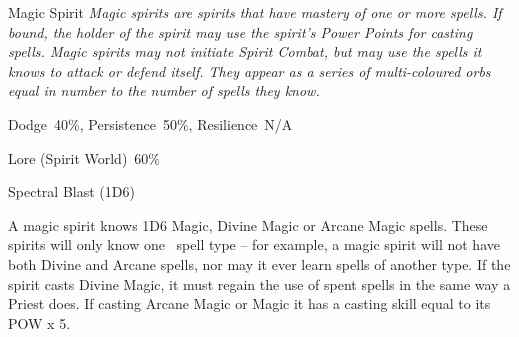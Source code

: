 \begin{samepage}
\begin{monsterbox}{Magic Spirit}
	\textit{Magic spirits are spirits that have mastery of one or more spells. If bound, the holder of the spirit may use the spirit’s Power Points for casting spells. Magic spirits may not initiate Spirit Combat, but may use the spells it knows to attack or defend itself. They appear as a series of multi-coloured orbs equal in number to the number of spells they know.}\\
	\rpghline
	\basics[%
	powerpoints = 14,
	movementrate = 30m,
	plunderrating = 0
	]
	\rpghline%
	\stats[ %
		STR = -,
		CON = -,
		DEX = -,
		SIZ = -,
		INT = 3D6    (11),
		POW = 4D6    (14),
		CHA = 1D6    (4)
	]
	\rpghline%
	\begin{rpg-monsteraction}[Resistances]
		Dodge~40\%, Persistence~50\%, Resilience~N/A
	\end{rpg-monsteraction}
	\begin{rpg-monsteraction}[Knowledge]
		Lore (Spirit World)~60\%
	\end{rpg-monsteraction}
	\begin{rpg-monsteraction}
		Spectral Blast (1D6)
	\end{rpg-monsteraction}
	\begin{rpg-monsteraction}[Magic]
		A magic spirit knows 1D6 Magic, Divine Magic or Arcane Magic spells. These spirits will only know one  spell type – for example, a magic spirit will not have both Divine and Arcane spells, nor may it ever learn spells of another type. If the spirit casts Divine Magic, it must regain the use of spent spells in the same way a Priest does. If casting Arcane Magic or Magic it has a casting skill equal to its POW x 5.
	\end{rpg-monsteraction}
\end{monsterbox}
\end{samepage}


